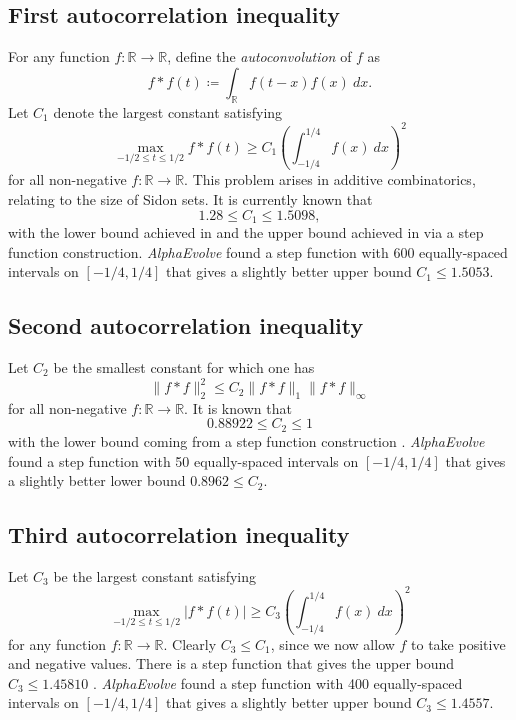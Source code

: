 \documentclass[logo,copyright,12pt]{googledeepmind}
\theoremstyle{definition}
\theoremstyle{remark}
\theoremstyle{plain}
\newcommand{\method}{\emph{AlphaEvolve}\xspace}
\begin{document}
\subsection{First autocorrelation inequality}
For any function $f: \mathbb{R} \rightarrow \mathbb{R}$, define the \emph{autoconvolution} of $f$ as $$f*f (t) \coloneqq \int_\mathbb{R} f(t-x) f(x)\ dx.$$
Let $C_1$ denote the largest constant satisfying
\begin{equation}\label{maxf}
 \max_{-1/2 \leq t \leq 1/2} f*f(t) \geq C_1 \left(\int_{-1/4}^{1/4} f(x)\ dx\right)^2
\end{equation}
for all non-negative $f: \mathbb{R} \rightarrow \mathbb{R}$.  This problem arises in additive combinatorics, relating to the size of Sidon sets.  It is currently known that
$$1.28 \leq C_1 \leq 1.5098,$$
with the lower bound achieved in \cite{cloninger2017suprema} and the upper bound achieved in \cite{matolcsi2010improved} via a step function construction.
\method found a step function with 600 equally-spaced intervals on $[-1/4,1/4]$ that gives a slightly better upper bound $C_1 \leq 1.5053$.

\subsection{Second autocorrelation inequality}
Let $C_2$ be the smallest constant for which one has
$$ \|f*f\|_2^2 \leq C_2 \|f*f\|_1 \|f*f\|_\infty$$
for all non-negative $f:\mathbb{R} \rightarrow \mathbb{R}$.
It is known that
$$ 0.88922 \leq C_2 \leq 1$$
with the lower bound coming from a step function construction \cite{matolcsi2010improved}. 
\method found a step function with 50 equally-spaced intervals on $[-1/4,1/4]$ that gives a slightly better lower bound $0.8962 \leq C_2$.

\subsection{Third autocorrelation inequality}
Let $C_3$ be the largest constant satisfying
$$ \max_{-1/2 \leq t \leq 1/2} \left|f*f(t)\right| \geq C_3 \left(\int_{-1/4}^{1/4} f(x)\ dx\right)^2$$
for any function $f: \mathbb{R}  \rightarrow \mathbb{R}$. Clearly $C_3 \leq C_1$, since we now allow $f$ to take positive and negative values.  
There is a step function that gives the upper bound $C_3 \leq 1.45810$ \cite[page 75]{vinuesa2010generalized}.
\method found a step function with 400 equally-spaced intervals on $[-1/4,1/4]$ that gives a slightly better upper bound $C_3 \leq 1.4557$.
\end{document}
